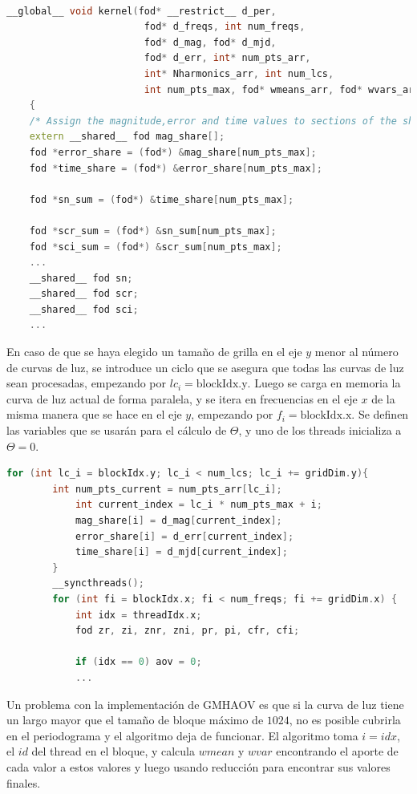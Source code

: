 \begin{lstlisting}[language=C++]
    
__global__ void kernel(fod* __restrict__ d_per,
                        fod* d_freqs, int num_freqs,
                        fod* d_mag, fod* d_mjd,
                        fod* d_err, int* num_pts_arr,
                        int* Nharmonics_arr, int num_lcs,
                        int num_pts_max, fod* wmeans_arr, fod* wvars_arr)
    {
    /* Assign the magnitude,error and time values to sections of the shared array */
    extern __shared__ fod mag_share[];
    fod *error_share = (fod*) &mag_share[num_pts_max];
    fod *time_share = (fod*) &error_share[num_pts_max];

    fod *sn_sum = (fod*) &time_share[num_pts_max];

    fod *scr_sum = (fod*) &sn_sum[num_pts_max];
    fod *sci_sum = (fod*) &scr_sum[num_pts_max];
    ...
    __shared__ fod sn;
    __shared__ fod scr;
    __shared__ fod sci;
    ...
\end{lstlisting}
En caso de que se haya elegido un tamaño de grilla en el eje $y$ menor al número de curvas de luz, se introduce un ciclo que se asegura que todas las curvas de luz sean procesadas, empezando por $lc_i = \text{blockIdx.y}$. Luego se carga en memoria la curva de luz actual de forma paralela, y se itera en frecuencias en el eje $x$ de la misma manera que se hace en el eje $y$, empezando por $f_i = \text{blockIdx.x}$. Se definen las variables que se usarán para el cálculo de $\Theta$, y uno de los threads inicializa a $\Theta=0$.
\begin{lstlisting}[language=C++]
    for (int lc_i = blockIdx.y; lc_i < num_lcs; lc_i += gridDim.y){
        int num_pts_current = num_pts_arr[lc_i];
            int current_index = lc_i * num_pts_max + i;
            mag_share[i] = d_mag[current_index];
            error_share[i] = d_err[current_index];
            time_share[i] = d_mjd[current_index]; 
        }
        __syncthreads();
        for (int fi = blockIdx.x; fi < num_freqs; fi += gridDim.x) {
            int idx = threadIdx.x;
            fod zr, zi, znr, zni, pr, pi, cfr, cfi;

            if (idx == 0) aov = 0;
            ...
\end{lstlisting}
Un problema con la implementación de GMHAOV es que si la curva de luz tiene un largo mayor que el tamaño de bloque máximo de $1024$, no es posible cubrirla en el periodograma y el algoritmo deja de funcionar. El algoritmo toma $i=idx$, el $id$ del thread en el bloque, y calcula $wmean$ y $wvar$ encontrando el aporte de cada valor a estos valores y luego usando reducción para encontrar sus valores finales.
